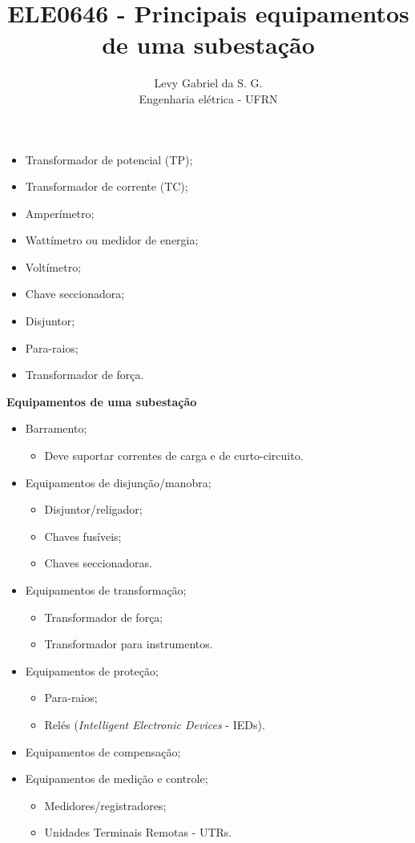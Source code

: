 \title{ELE0646 - Principais equipamentos de uma subestação}
\author{Levy Gabriel da S. G. \\ Engenharia elétrica - UFRN}

\maketitle
\thispagestyle{fancy}

\begin{itemize}
    \item Transformador de potencial (TP);
    \item Transformador de corrente (TC);
    \item Amperímetro;
    \item Wattímetro ou medidor de energia;
    \item Voltímetro;
    \item Chave seccionadora;
    \item Disjuntor;
    \item Para-raios;
    \item Transformador de força.
\end{itemize}

\textbf{Equipamentos de uma subestação}

\begin{itemize}
    \item Barramento;
    \begin{itemize}
        \item Deve suportar correntes de carga e de curto-circuito.
    \end{itemize}
    \item Equipamentos de disjunção/manobra;
    \begin{itemize}
        \item Disjuntor/religador;
        \item Chaves fusíveis;
        \item Chaves seccionadoras.
    \end{itemize}
    \item Equipamentos de transformação;
    \begin{itemize}
        \item Transformador de força;
        \item Transformador para instrumentos.
    \end{itemize}
    \item Equipamentos de proteção;
    \begin{itemize}
        \item Para-raios;
        \item Relés (\textit{Intelligent Electronic Devices} - IEDs).
    \end{itemize}
    \item Equipamentos de compensação;
    \item Equipamentos de medição e controle;
    \begin{itemize}
        \item Medidores/registradores;
        \item Unidades Terminais Remotas - UTRs.
    \end{itemize}
\end{itemize}